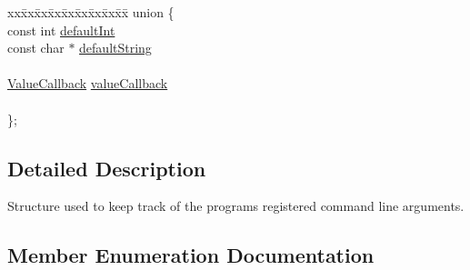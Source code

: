 \begin{DoxyCompactItemize}
\begin{tabbing}
xx\=xx\=xx\=xx\=xx\=xx\=xx\=xx\=xx\=\kill
union \{\\
\>const int \hyperlink{structcli_1_1args_1_1_param_info__t_aef0bcad86590bda0c63044e181621b3f}{defaultInt}\\
\>const char $\ast$ \hyperlink{structcli_1_1args_1_1_param_info__t_aeed70a91a7078bb08b40119e6d06933a}{defaultString}\\
\>\\
\>\hyperlink{structcli_1_1args_1_1_param_info__t_1_1_value_callback}{ValueCallback} \hyperlink{structcli_1_1args_1_1_param_info__t_aab1ed9470e54a9ec255967639dc3811c}{valueCallback}\\
\>\\
\}; \\

\end{tabbing}\end{DoxyCompactItemize}


\subsection{Detailed Description}
Structure used to keep track of the programs registered command line arguments. 

\subsection{Member Enumeration Documentation}
